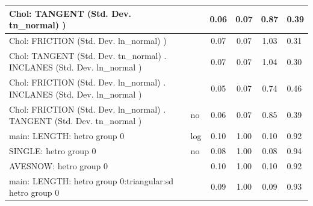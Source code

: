 \begin{table}
\begin{center}
\begin{tabular}{|l|l|c|c|c|l|}
			\hline
			 Chol: TANGENT (Std. Dev. tn_normal) ) &  & 0.06 & 0.07 & 0.87 & 0.39 \\
			\hline
			 Chol: FRICTION (Std. Dev. ln_normal) ) &  & 0.07 & 0.07 & 1.03 & 0.31 \\
			\hline
			 Chol: TANGENT (Std. Dev. tn_normal) . INCLANES (Std. Dev.   ln_normal ) &  & 0.07 & 0.07 & 1.04 & 0.30 \\
			\hline
			 Chol: FRICTION (Std. Dev. ln_normal) . INCLANES (Std. Dev.   ln_normal ) &  & 0.05 & 0.07 & 0.74 & 0.46 \\
			\hline
			 Chol: FRICTION (Std. Dev. ln_normal) . TANGENT (Std. Dev.   tn_normal ) & no & 0.06 & 0.07 & 0.85 & 0.39 \\
			\hline
			main: LENGTH: hetro group 0 & log & 0.10 & 1.00 & 0.10 & 0.92 \\
			\hline
			SINGLE: hetro group 0 & no & 0.08 & 1.00 & 0.08 & 0.94 \\
			\hline
			AVESNOW: hetro group 0 &  & 0.10 & 1.00 & 0.10 & 0.92 \\
			\hline
			main: LENGTH: hetro group 0:triangular:sd  hetro group 0 &  & 0.09 & 1.00 & 0.09 & 0.93 \\
			\hline
		\end{tabular}
	\end{center}
\end{table}